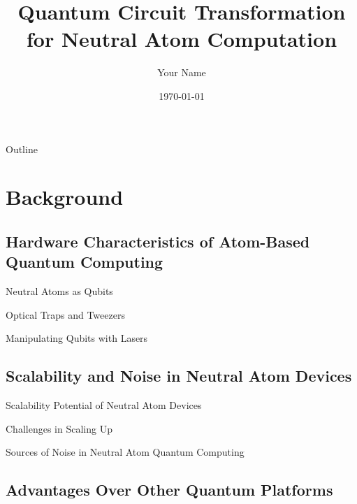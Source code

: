 \documentclass{beamer}
\title{Quantum Circuit Transformation for Neutral Atom Computation}
\author{Your Name}
\date{\today}
\begin{document}
\begin{frame}
  \titlepage
\end{frame}

\begin{frame}{Outline}
  \tableofcontents
\end{frame}


\section{Background}

\subsection{Hardware Characteristics of Atom-Based Quantum Computing}

\begin{frame}{Neutral Atoms as Qubits}
\end{frame}

\begin{frame}{Optical Traps and Tweezers}
\end{frame}

\begin{frame}{Manipulating Qubits with Lasers}
\end{frame}

\subsection{Scalability and Noise in Neutral Atom Devices}

\begin{frame}{Scalability Potential of Neutral Atom Devices}
\end{frame}

\begin{frame}{Challenges in Scaling Up}
\end{frame}

\begin{frame}{Sources of Noise in Neutral Atom Quantum Computing}
\end{frame}

\subsection{Advantages Over Other Quantum Platforms}
\end{document}
